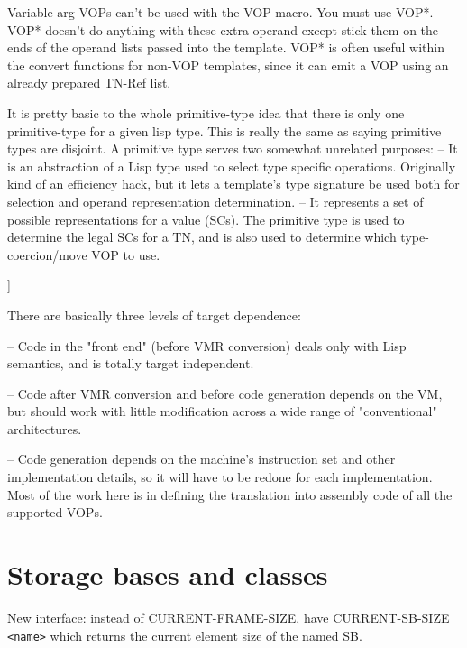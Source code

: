     Variable-arg VOPs can't be used with the VOP macro.  You must use VOP*.
    VOP* doesn't do anything with these extra operand except stick them on the
    ends of the operand lists passed into the template.  VOP* is often useful
    within the convert functions for non-VOP templates, since it can emit a VOP
    using an already prepared TN-Ref list.
    

    It is pretty basic to the whole primitive-type idea that there is only one
    primitive-type for a given lisp type.  This is really the same as saying
    primitive types are disjoint.  A primitive type serves two somewhat
    unrelated purposes:
     -- It is an abstraction of a Lisp type used to select type specific
        operations.  Originally kind of an efficiency hack, but it lets a
        template's type signature be used both for selection and operand
        representation determination.
     -- It represents a set of possible representations for a value (SCs).  The
        primitive type is used to determine the legal SCs for a TN, and is also
        used to determine which type-coercion/move VOP to use.

]

There are basically three levels of target dependence:

 -- Code in the "front end" (before VMR conversion) deals only with Lisp
    semantics, and is totally target independent.

 -- Code after VMR conversion and before code generation depends on the VM,
    but should work with little modification across a wide range of
    "conventional" architectures.

 -- Code generation depends on the machine's instruction set and other
    implementation details, so it will have to be redone for each
    implementation.  Most of the work here is in defining the translation into
    assembly code of all the supported VOPs.



\chapter{Storage bases and classes}
New interface: instead of CURRENT-FRAME-SIZE, have CURRENT-SB-SIZE \verb+<name>+ which
returns the current element size of the named SB.

